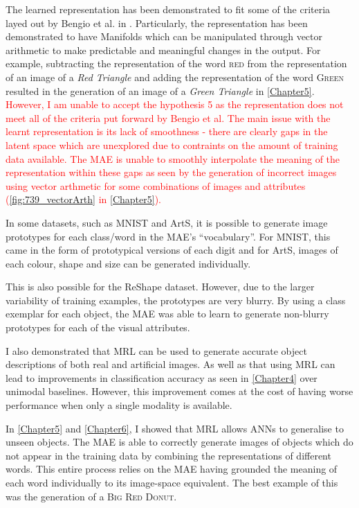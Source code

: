 The learned representation has been demonstrated to fit some of the criteria layed out by Bengio et al. in \cite{repRev}. Particularly, the representation has been demonstrated to have Manifolds which can be manipulated through vector arithmetic to make predictable and meaningful changes in the output. For example, subtracting the representation of the word \textsc{red} from the representation of an image of a \textit{Red Triangle} and adding the representation of the word \textsc{Green} resulted in the generation of an image of a \textit{Green Triangle} in \autoref{Chapter5}.  \textcolor{red}{However, I am unable to accept the hypothesis 5 as the representation does not meet all of the criteria put forward by Bengio et al. The main issue with the learnt representation is its lack of smoothness - there are clearly gaps in the latent space which are unexplored due to contraints on the amount of training data available. The \ac{MAE} is unable to smoothly interpolate the meaning of the representation within these gaps as seen by the generation of incorrect images using vector arthmetic for some combinations of images and attributes (\autoref{fig:739_vectorArth} in \autoref{Chapter5}).}

In some datasets, such as MNIST and ArtS, it is possible to generate image prototypes for each class/word in the \ac{MAE}'s ``vocabulary''. For MNIST, this came in the form of prototypical versions of each digit and for ArtS, images of each colour, shape and size can be generated individually.

This is also possible for the ReShape dataset. However, due to the larger variability of training examples, the prototypes are very blurry. By using a class exemplar for each object, the \ac{MAE} was able to learn to generate non-blurry prototypes for each of the visual attributes.

I also demonstrated that \ac{MRL} can be used to generate accurate object descriptions of both real and artificial images. As well as that using \ac{MRL} can lead to improvements in classification accuracy as seen in \autoref{Chapter4} over unimodal baselines. However, this improvement comes at the cost of having worse performance when only a single modality is available.

In \autoref{Chapter5} and \autoref{Chapter6}, I showed that \ac{MRL} allows \acp{ANN} to generalise to unseen objects. The \ac{MAE} is able to correctly generate images of objects which do not appear in the training data by combining the representations of different words. This entire process relies on the \ac{MAE} having grounded the meaning of each word individually to its image-space equivalent. The best example of this was the generation of a \textsc{Big Red Donut}.

